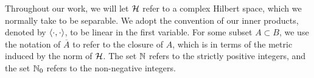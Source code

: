 \medskip

Throughout our work, we will let $\mathcal{H}$ refer to a complex Hilbert space, which we normally take to be separable. We adopt the convention of our inner products, denoted by $\left\langle \cdot, \cdot\right\rangle$, to be linear in the first variable. For some subset $A \subset B$, we use the notation of $\overline{A}$ to refer to the closure of $A$, which is in terms of the metric induced by the norm of $\mathcal{H}$. The set $\mathbb{N}$ refers to the strictly positive integers, and the set $\mathbb{N}_0$ refers to the non-negative integers.


